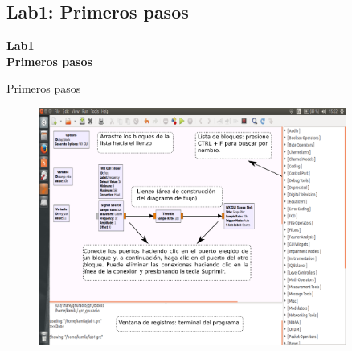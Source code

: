 \subsection{Lab1: Primeros pasos}
\begin{frame}{}


\bfseries{\textrm{\LARGE Lab1\\ \Large Primeros pasos}}
\raggedright
\end{frame}

\begin{frame}{Primeros pasos}


\begin{figure}[H]
\centering
\vspace{-3mm}
\includegraphics[width=0.9\textwidth]{parte1/lab1/pdf/lab1_1.pdf}
\end{figure}
\end{frame}


